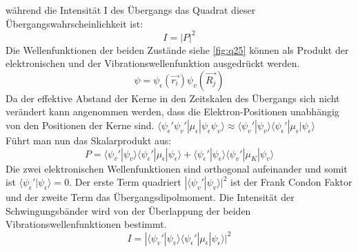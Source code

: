 während die Intensität I des Übergangs das Quadrat dieser Übergangswahrscheinlichkeit ist: 
\begin{equation}
    I = |P|^2
\end{equation}
Die Wellenfunktionen der beiden Zustände siehe \autoref{fig:q25} können als Produkt der elektronischen und der Vibrationswellenfunktion ausgedrückt werden.
\begin{equation}
    \psi = \psi_{\epsilon}(\vec{r_i}) \psi_v(\vec{R_j})
\end{equation} 
Da der effektive Abstand der Kerne in den Zeitskalen des Übergangs sich nicht verändert kann angenommen werden, dass die Elektron-Positionen unabhängig von den Positionen der Kerne sind.
$\langle \psi_{\epsilon}' \psi_v' | \mu_{\epsilon}| \psi_{\epsilon} \psi_v\rangle  \approx  \langle\psi_v' |\psi_v \rangle \langle\psi_{\epsilon}'|\mu_{\epsilon}| \psi_{\epsilon} \rangle $ \\
Führt man nun das Skalarprodukt aus:
\begin{equation}
    P = \langle \psi_v' | \psi_v \rangle \langle \psi_{\epsilon}' | \mu_{\epsilon} | \psi_{\epsilon} \rangle + \langle \psi_{\epsilon}' | \psi_{\epsilon} \rangle \langle\psi_v' | \mu_K |\psi_v \rangle
\end{equation}
Die zwei elektronischen Wellenfunktionen sind orthogonal aufeinander und somit ist $\langle \psi_{\epsilon}' | \psi_{\epsilon} \rangle  = 0$.
Der erste Term quadriert $|\langle \psi_v' | \psi_v \rangle|^2$ ist der Frank Condon Faktor und der zweite Term das Übergangsdipolmoment. 
Die Intensität der Schwingungsbänder wird von der Überlappung der beiden Vibrationswellenfunktionen bestimmt.
\begin{equation}
    I = |\langle \psi_v' | \psi_v \rangle \langle \psi_{\epsilon}' | \mu_{\epsilon} | \psi_{\epsilon} \rangle|^2
\end{equation}


\label{q:26}

